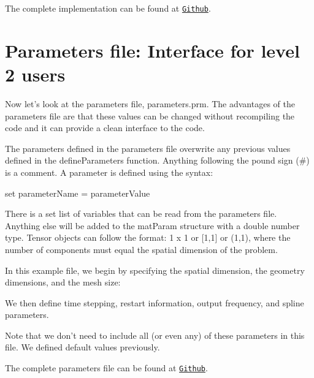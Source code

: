 \begin{DoxyCodeInclude}

\end{DoxyCodeInclude}


The complete implementation can be found at \href{https://github.com/mechanoChem/mechanoChemIGA/blob/master/initBounValProbs/CahnHilliard_twoSpecies/2D/userFunctions.cc}{\tt Github}.

\section*{Parameters file\-: Interface for level 2 users }

Now let's look at the parameters file, {\ttfamily parameters.\-prm}. The advantages of the parameters file are that these values can be changed without recompiling the code and it can provide a clean interface to the code. 

The parameters defined in the parameters file overwrite any previous values defined in the {\ttfamily define\-Parameters} function. Anything following the pound sign (\#) is a comment. A parameter is defined using the syntax\-:

{\ttfamily set} {\ttfamily parameter\-Name} {\ttfamily =} {\ttfamily parameter\-Value} 

There is a set list of variables that can be read from the parameters file. Anything else will be added to the {\ttfamily mat\-Param} structure with a double number type. Tensor objects can follow the format\-: 1 x 1 or \mbox{[}1,1\mbox{]} or (1,1), where the number of components must equal the spatial dimension of the problem.

In this example file, we begin by specifying the spatial dimension, the geometry dimensions, and the mesh size\-:


\begin{DoxyCodeInclude}

\end{DoxyCodeInclude}


We then define time stepping, restart information, output frequency, and spline parameters.


\begin{DoxyCodeInclude}

\end{DoxyCodeInclude}


Note that we don't need to include all (or even any) of these parameters in this file. We defined default values previously.

The complete parameters file can be found at \href{https://github.com/mechanoChem/mechanoChemIGA/blob/master/initBounValProbs/CahnHilliard_twoSpecies/2D/parameters.prm}{\tt Github}. 